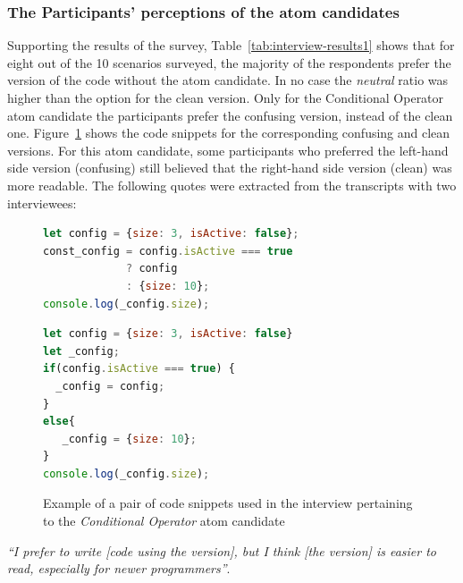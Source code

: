 \subsubsection*{The Participants' perceptions of the atom candidates} Supporting the results of the survey, Table~\ref{tab:interview-results1}
 shows that for eight out of the
10 scenarios surveyed, the majority of the respondents prefer the version of the
code without the atom candidate.
In no case the \emph{neutral}
ratio was higher than the option for the clean version.
Only for the Conditional Operator atom candidate the participants prefer the confusing version, instead of the clean one. Figure~\ref{code:ternary} shows the code snippets for the corresponding confusing and clean versions. For this atom candidate, some participants who preferred the left-hand side version (confusing) still believed that the right-hand side version (clean) was more readable. The following quotes were extracted from the transcripts with
two interviewees:

\begin{figure}

\noindent\begin{minipage}{.45\textwidth}
\begin{lstlisting}[language=JavaScript, caption=\emph{Left-hand side} (using the \emph{Conditional Operator} atom).]
let config = {size: 3, isActive: false};
const_config = config.isActive === true 
             ? config 
             : {size: 10};
console.log(_config.size);
\end{lstlisting}
\end{minipage}\hfill
\begin{minipage}{.45\textwidth}
\begin{lstlisting}[language=JavaScript, caption=\emph{Right-hand side} (without the atom).]
let config = {size: 3, isActive: false}
let _config;
if(config.isActive === true) {
  _config = config;
}
else{
   _config = {size: 10};
}
console.log(_config.size);
\end{lstlisting}
\end{minipage}
\caption{Example of a pair of code snippets used in the interview pertaining to the \emph{Conditional Operator} atom candidate}
\label{code:ternary}
\vspace{-0.2cm}
\end{figure}

\begin{mq}
\emph{``I prefer to write [code using the \lhs version], but I think [the \rhs version] is easier to read, especially for newer programmers''}.
\end{mq}

